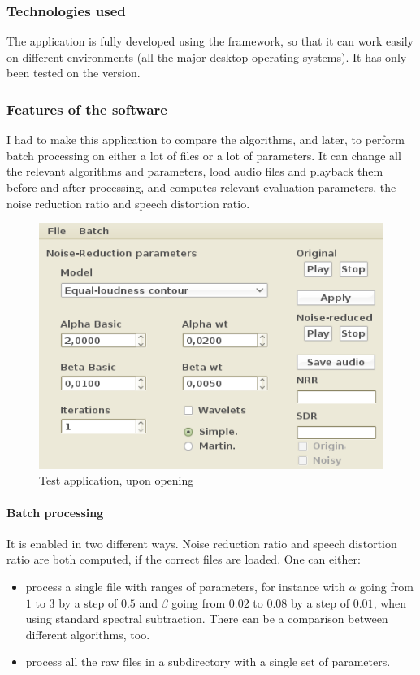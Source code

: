 \subsubsection{Technologies used}
The application is fully developed using the  framework, so that it can work easily on different environments (all the major desktop operating systems). It has only been tested on the  version.

\subsubsection{Features of the software}
I had to make this application to compare the algorithms, and later, to perform batch processing on either a lot of files or a lot of parameters.
It can change all the relevant algorithms and parameters, load audio files and playback them before and after processing, and computes relevant evaluation parameters, the noise reduction ratio and speech distortion ratio\cite{horii2013musical}.
\begin{figure}[h]
\begin{center}
\includegraphics[scale=0.75]{testapp1.png}
\caption{Test application, upon opening}
\label{diag_api_chords}
\end{center}
\end{figure}

\paragraph{Batch processing} It is enabled in two different ways. 
Noise reduction ratio and speech distortion ratio are both computed, if the correct files are loaded.
One can either:
\begin{itemize}
\item process a single file with ranges of parameters, for instance with $\alpha$ going from $1$ to $3$ by a step of $0.5$ and  $\beta$ going from $0.02$ to $0.08$ by a step of $0.01$, when using standard spectral subtraction. There can be a comparison between different algorithms, too.
\item process all the raw files in a subdirectory with a single set of parameters.
\end{itemize}

